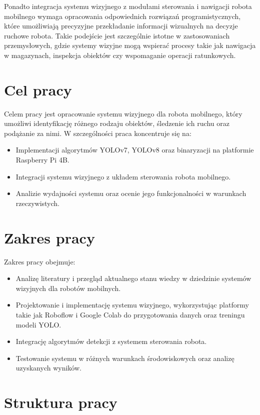 \documentclass[a4paper,twoside,12pt]{book}
\begin{document}
Ponadto integracja systemu wizyjnego z modułami sterowania i nawigacji robota mobilnego wymaga opracowania odpowiednich rozwiązań programistycznych, które umożliwiają precyzyjne przekładanie informacji wizualnych na decyzje ruchowe robota. Takie podejście jest szczególnie istotne w zastosowaniach przemysłowych, gdzie systemy wizyjne mogą wspierać procesy takie jak nawigacja w magazynach, inspekcja obiektów czy wspomaganie operacji ratunkowych.


\section{Cel pracy}
Celem pracy jest opracowanie systemu wizyjnego dla robota mobilnego, który umożliwi identyfikację różnego rodzaju obiektów, śledzenie ich ruchu oraz podążanie za nimi. W szczególności praca koncentruje się na:
\begin{itemize}
    \item Implementacji algorytmów YOLOv7, YOLOv8 oraz binaryzacji na platformie Raspberry Pi 4B.
    \item Integracji systemu wizyjnego z układem sterowania robota mobilnego.
    \item Analizie wydajności systemu oraz ocenie jego funkcjonalności w warunkach rzeczywistych.
\end{itemize}

\newpage

\section{Zakres pracy}

Zakres pracy obejmuje:
\begin{itemize}
    \item Analizę literatury i przegląd aktualnego stanu wiedzy w dziedzinie systemów wizyjnych dla robotów mobilnych.
    \item Projektowanie i implementację systemu wizyjnego, wykorzystując platformy takie jak Roboflow i Google Colab do przygotowania danych oraz treningu modeli YOLO.
    \item Integrację algorytmów detekcji z systemem sterowania robota.
    \item Testowanie systemu w różnych warunkach środowiskowych oraz analizę uzyskanych wyników.
\end{itemize}

\section{Struktura pracy}
\end{document}
